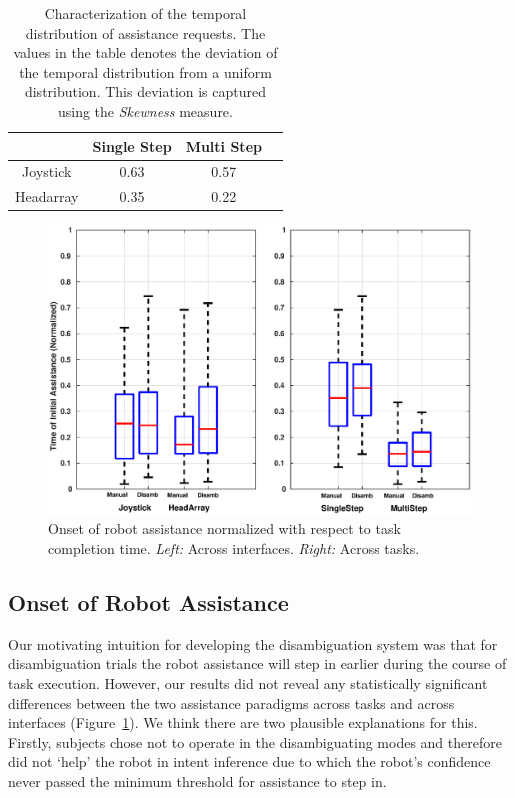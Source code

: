 \begin{table}[t]
	\centering
	\begin{tabular}{|c|c|c|c|}
		\hline
		& Single Step & Multi Step \\
		\hline
		Joystick & 0.63 & 0.57 \\
		\hline
		Headarray & 0.35 & 0.22 \\
		\hline
	\end{tabular}
	\vspace{.2cm}
	\caption{Characterization of the temporal distribution of assistance requests. The values in the table denotes the deviation of the temporal distribution from a uniform distribution. This deviation is captured using the \textit{Skewness} measure. } 
	\label{table:skewness}
	\vspace{-.5cm}
\end{table}

\begin{figure}[ht!]
	\centering
	\includegraphics[width = 1\hsize ,center]{./figures/initial_blend_new.eps}
	\caption{Onset of robot assistance normalized with respect to task completion time. \textit{Left:} Across interfaces. \textit{Right:} Across tasks.}
	\label{fig:initial_blend}
\end{figure}
\subsection{Onset of Robot Assistance}\label{ssec:onset}
Our motivating intuition for developing the disambiguation system was that for disambiguation trials the robot assistance will step in earlier during the course of task execution. However, our results did not reveal any statistically significant differences between the two assistance paradigms across tasks and across interfaces (Figure~\ref{fig:initial_blend}). We think there are two plausible explanations for this. Firstly, subjects chose not to operate in the disambiguating modes and therefore did not `help' the robot in intent inference due to which the robot's confidence never passed the minimum threshold for assistance to step in. 

